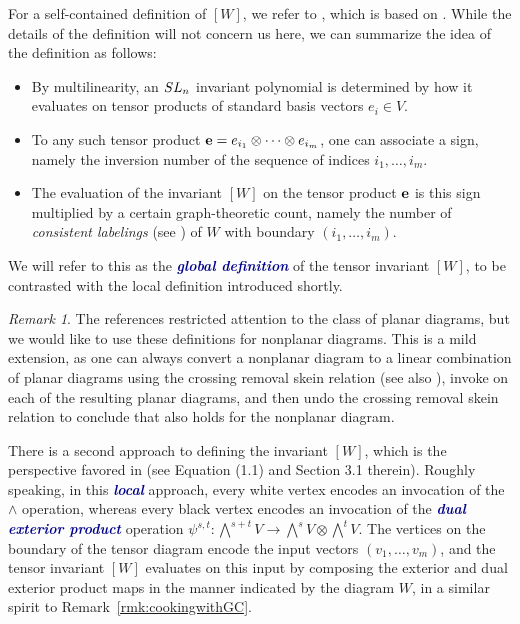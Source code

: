 \documentclass[10pt]{amsart}
\theoremstyle{definition}
\theoremstyle{plain}
\theoremstyle{plain}
\theoremstyle{definition}
\theoremstyle{remark}
\newtheorem{remark}[cdrthm]{Remark}
\theoremstyle{plain}
\theoremstyle{plain}
\theoremstyle{plain}
\numberwithin{equation}{section}
\newcommand{\newword}[1]{\textcolor{darkblue}{\textbf{\emph{#1}}}}
\begin{document}
For a self-contained definition of $[W]$, we refer to \cite[Definition 4.1]{Fraser:2column}, which is based on \cite[Lemma 5.4]{Fraser.Lam.Le}. While the details of the definition will not concern us here, we can summarize the idea of the definition as follows:
\begin{itemize}
    \item By multilinearity, an ${\rm SL}_n$ invariant polynomial is determined by how it evaluates on tensor products of standard basis vectors $e_i \in V$.
    \item To any such tensor product ${\bf e} = e_{i_1} \otimes \cdots \otimes e_{i_m}$, one can associate a sign, namely the inversion number of the sequence of indices $i_1,\dots,i_m$. 
    \item The evaluation of the invariant $[W]$ on the tensor product ${\bf e}$ is this sign multiplied by a certain graph-theoretic count, namely the number of \emph{consistent labelings} (see \cite[Definition~3.1]{Fraser:2column}) of $W$ with boundary $(i_1,\dots,i_m)$.   
\end{itemize} 

We will refer to this as the \newword{global definition} of the tensor invariant $[W]$, to be contrasted with the local definition introduced shortly.

\begin{remark}
The references \cite{Fraser:2column, Fraser.Lam.Le} restricted attention to the class of planar diagrams, but we would like to use these definitions for nonplanar diagrams. This is a mild extension, as one can always convert a nonplanar diagram to a linear combination of planar diagrams using the crossing removal skein relation \cite[Corollary 6.2.3]{Cautis.Kamnitzer.Morrison} (see also \cite[Equation (34)]{Fraser.Pylyavskyy}), invoke \cite[Lemma 5.4]{Fraser.Lam.Le} on each of the resulting planar diagrams, and then undo the crossing removal skein relation to conclude that \cite[Lemma 5.4]{Fraser.Lam.Le} also holds for the nonplanar diagram.
\end{remark}

There is a second approach to defining the invariant $[W]$, which is the perspective favored in \cite{Cautis.Kamnitzer.Morrison} (see \eg Equation (1.1) and Section 3.1 therein). Roughly speaking, in this \newword{local} approach, every white vertex encodes an invocation of the $\wedge$ operation, whereas every black vertex encodes an invocation of the \newword{dual exterior product} operation $\psi^{s,t} \colon \bigwedge^{s+t}V \to \bigwedge^s V \otimes \bigwedge^tV$. The vertices on the boundary of the tensor diagram encode the input vectors $(v_1,\dots,v_m)$, and the tensor invariant $[W]$ evaluates on this input by composing the exterior and dual exterior product maps in the manner indicated by the diagram $W$, in a similar spirit to Remark~\ref{rmk:cookingwithGC}. 
\end{document}
